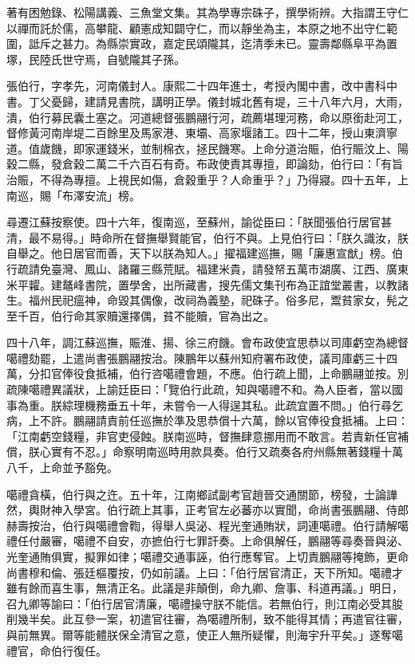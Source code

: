 \begin{pinyinscope}
著有困勉錄、松陽講義、三魚堂文集。其為學專宗硃子，撰學術辨。大指謂王守仁以禪而託於儒，高攀龍、顧憲成知闢守仁，而以靜坐為主，本原之地不出守仁範圍，詆斥之甚力。為縣崇實政，嘉定民頌隴其，迄清季未已。靈壽鄰縣阜平為置塚，民陸氏世守焉，自號隴其子孫。

張伯行，字孝先，河南儀封人。康熙二十四年進士，考授內閣中書，改中書科中書。丁父憂歸，建請見書院，講明正學。儀封城北舊有堤，三十八年六月，大雨，潰，伯行募民囊土塞之。河道總督張鵬翮行河，疏薦堪理河務，命以原銜赴河工，督修黃河南岸堤二百餘里及馬家港、東壩、高家堰諸工。四十二年，授山東濟寧道。值歲饑，即家運錢米，並制棉衣，拯民饑寒。上命分道治賑，伯行賑汶上、陽穀二縣，發倉穀二萬二千六百石有奇。布政使責其專擅，即論劾，伯行曰：「有旨治賑，不得為專擅。上視民如傷，倉穀重乎？人命重乎？」乃得寢。四十五年，上南巡，賜「布澤安流」榜。

尋遷江蘇按察使。四十六年，復南巡，至蘇州，諭從臣曰：「朕聞張伯行居官甚清，最不易得。」時命所在督撫舉賢能官，伯行不與。上見伯行曰：「朕久識汝，朕自舉之。他日居官而善，天下以朕為知人。」擢福建巡撫，賜「廉惠宣猷」榜。伯行疏請免臺灣、鳳山、諸羅三縣荒賦。福建米貴，請發帑五萬巿湖廣、江西、廣東米平糶。建鼇峰書院，置學舍，出所藏書，搜先儒文集刊布為正誼堂叢書，以教諸生。福州民祀瘟神，命毀其偶像，改祠為義塾，祀硃子。俗多尼，鬻貧家女，髡之至千百，伯行命其家贖還擇偶，貧不能贖，官為出之。

四十八年，調江蘇巡撫，賑淮、揚、徐三府饑。會布政使宜思恭以司庫虧空為總督噶禮劾罷，上遣尚書張鵬翮按治。陳鵬年以蘇州知府署布政使，議司庫虧三十四萬，分扣官俸役食抵補，伯行咨噶禮會題，不應。伯行疏上聞，上命鵬翮並按。別疏陳噶禮異議狀，上諭廷臣曰：「覽伯行此疏，知與噶禮不和。為人臣者，當以國事為重。朕綜理機務垂五十年，未嘗令一人得逞其私。此疏宜置不問。」伯行尋乞病，上不許。鵬翮請責前任巡撫於準及思恭償十六萬，餘以官俸役食抵補。上曰：「江南虧空錢糧，非官吏侵蝕。朕南巡時，督撫肆意挪用而不敢言。若責新任官補償，朕心實有不忍。」命察明南巡時用款具奏。伯行又疏奏各府州縣無著錢糧十萬八千，上命並予豁免。

噶禮貪橫，伯行與之迕。五十年，江南鄉試副考官趙晉交通關節，榜發，士論譁然，輿財神入學宮。伯行疏上其事，正考官左必蕃亦以實聞，命尚書張鵬翮、侍郎赫壽按治，伯行與噶禮會鞫，得舉人吳泌、程光奎通賄狀，詞連噶禮。伯行請解噶禮任付嚴審，噶禮不自安，亦摭伯行七罪訐奏。上命俱解任，鵬翮等尋奏晉與泌、光奎通賄俱實，擬罪如律；噶禮交通事誣，伯行應奪官。上切責鵬翮等掩飾，更命尚書穆和倫、張廷樞覆按，仍如前議。上曰：「伯行居官清正，天下所知。噶禮才雖有餘而喜生事，無清正名。此議是非顛倒，命九卿、詹事、科道再議。」明日，召九卿等諭曰：「伯行居官清廉，噶禮操守朕不能信。若無伯行，則江南必受其朘削幾半矣。此互參一案，初遣官往審，為噶禮所制，致不能得其情；再遣官往審，與前無異。爾等能體朕保全清官之意，使正人無所疑懼，則海宇升平矣。」遂奪噶禮官，命伯行復任。


\end{pinyinscope}
